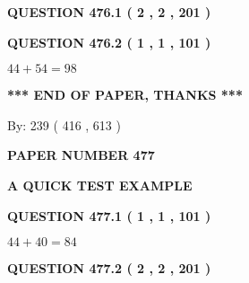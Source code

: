 \documentclass[12pt]{article}
\begin{document}
\vspace{0.2in}
  
{\textbf{\Large{QUESTION
476.1 
 ( 2 , 2 , 201 )
}}}
  
  
  
\vspace{0.2in}
  
{\textbf{\Large{QUESTION
476.2 
 ( 1 , 1 , 101 )
}}}
  
  
 
 

$ %
44 +  %
54=   %
98$
 
 
   
   
 \vspace{0.2in}
 
   
   
   
   
\vspace{1.0in} 
{\textbf{\large{ *** END OF PAPER, THANKS *** }}} 
   
   
\hspace{1.0in} By: 
 239 ( 416 ,  613 )
   
   
   
   
\newpage 
\setcounter{page}{ 
   477001 } 
   
   
   
   
 {\textbf{ \Large{ PAPER NUMBER  477  }}}
   
   
\vspace{0.2in}
   
   
   
   
   
   
 \vspace{0.2in}
{\LARGE {\textbf{ A QUICK TEST EXAMPLE}}}
   
   
  
\vspace{0.2in}
  
{\textbf{\Large{QUESTION
477.1 
 ( 1 , 1 , 101 )
}}}
  
  
 
 

$ %
44 +  %
40=   %
84$
 
 
  
\vspace{0.2in}
  
{\textbf{\Large{QUESTION
477.2 
 ( 2 , 2 , 201 )
}}}
  
  
   
   
 \vspace{0.2in}
 
\end{document}
